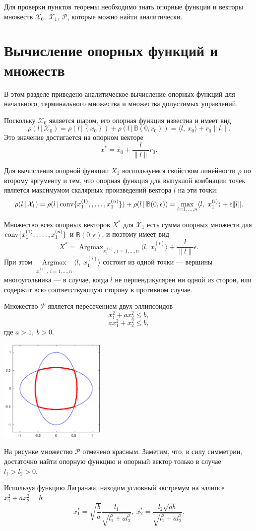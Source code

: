 \documentclass[11pt]{article}
\newcommand\PS{\mathcal{P}}
\newcommand\X{\mathcal{X}}
\newcommand\Sup[2]{\rho( #1 \, | \, #2 )}
\newcommand\Conv[1]{{\rm conv}\{ #1 \}}
\DeclareMathOperator*{\Argmax}{Argmax}
\begin{document}
Для проверки пунктов теоремы необходимо знать опорные функции и векторы множеств $\X_0, \ \X_1, \ \PS$, 
которые можно найти аналитически.

\newpage
\section{Вычисление опорных функций и множеств}
В этом разделе приведено аналитическое вычисление опорных функций для начального, терминального множества и множества допустимых управлений.

Поскольку $\X_0$ является шаром, его опорная функция известна и имеет вид
$$\Sup{l}{\X_0} = \Sup{l}{\left\{x_0\right\}} + \Sup{l}{\mathbb{B}(0, r_0)} = 
\langle l, \ x_0 \rangle + r_0\|l\|.$$
Это значение достигается на опорном векторе 
$$x^* = x_0 + \frac{l}{\|l\|}r_0.$$

Для вычисления опорной функции $X_1$ воспользуемся свойством линейности $\rho$ по второму аргументу и 
тем, что опорная функция для выпуклой комбнации точек является максимумом скалярных произведений
вектора $l$ на эти точки:
$$\Sup{l}{\X_1} = \Sup{l}{\Conv{x_1^{\left(1\right)},, \ldots, x_1^{\left(n\right)}}} + \Sup{l}{\mathbb{B}(0, \epsilon)} =
\max_{i = 1,\ldots,n} \langle l, \ x_1^{\left(i\right)} \rangle + \epsilon \|l\|.$$

Множество всех опорных векторов $X^*$ для $\X_1$ есть сумма опорных множеств для 
$\Conv{x_1^{\left(1\right)},, \ldots, x_1^{\left(n\right)}}$ и $\mathbb{B}(0, \epsilon)$, и поэтому
имеет вид
$$ X^* = \Argmax_{x_1^{\left(i\right)}, \ i = 1, \ldots, n} \langle l, \ x_1^{\left(i\right)}\rangle + \frac{l}{\|l\|
}\epsilon.$$
При этом $\Argmax\limits_{x_1^{\left(i\right)}, \ i = 1, \ldots, n} \langle l, \ x_1^{\left(i\right)}\rangle$ состоит из одной точки
--- вершины многоугольника --- в случае, когда $l$ не перпендикулярен ни одной из сторон, или 
содержит всю соответствующую сторону в противном случае.

Множество $\PS$ является пересечением двух эллипсоидов \\
$$x_1^2 + a x_2^2 \leq b,$$
$$ax_1^2 + x_2^2 \leq b,$$
где $a > 1, \ b > 0$. \\

\noindent
\parbox[b][5cm][t]{50mm}{\includegraphics[height=50mm]{P_set.eps}}
\hfill
\parbox[b][5cm][t]{90mm}{
На рисунке множество $\PS$ отмечено красным. Заметим, что, в силу симметрии, достаточно найти опорную
функцию и опорный вектор только в случае $l_1 > l_2 > 0$.

Используя функцию Лагранжа, находим условный экстремум на эллипсе $x_1^2 + a x_2^2 = b$:
$$x_1^* = \sqrt{\frac{b}{a}}\frac{l_1}{\sqrt{l_1^2+al_2^2}}, \ x_2^* = \frac{l_2\sqrt{ab}}{\sqrt{l_1^2+al_2^2}}.$$
}
\end{document}
